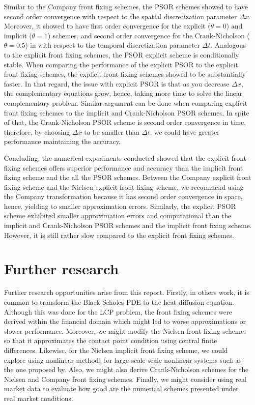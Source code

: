 Similar to the Company front fixing schemes, the PSOR schemes showed to have second order convergence with respect to the spatial discretization parameter $\Delta{x}$. Moreover, it showed to have first order convergence for the explicit ($\theta=0$) and implicit ($\theta=1$) schemes, and second order convergence for the Crank-Nicholson ($\theta=0.5$) in with respect to the temporal discretization parameter $\Delta{t}$. Analogous to the explicit front fixing schemes, the PSOR explicit scheme is conditionally stable. When comparing the performance of the explicit PSOR to the explicit front fixing schemes, the explicit front fixing schemes showed to be substantially faster. In that regard, the issue with explicit PSOR is that as you decrease $\Delta{x}$, the complementary equations grow, hence, taking more time to solve the linear complementary problem. Similar argument can be done when comparing explicit front fixing schemes to the implicit and Crank-Nicholson PSOR schemes. In spite of that, the Crank-Nicholson PSOR scheme is second order convergence in time, therefore, by choosing $\Delta{x}$ to be smaller than $\Delta{t}$, we could have greater performance maintaining the accuracy. 

Concluding, the numerical experiments conducted showed that the explicit front-fixing schemes offers superior performance and accuracy than the implicit front fixing scheme and the all the PSOR schemes. Between the Company explicit front fixing scheme and the Nielsen explicit front fixing scheme, we recommend using the Company transformation because it has second order convergence in space, hence, yielding to smaller approximation errors. Similarly, the explicit PSOR scheme exhibited smaller approximation errors and computational than the implicit and Crank-Nicholson PSOR schemes and the implicit front fixing scheme. However, it is still rather slow compared to the explicit front fixing schemes.

\section{Further research}

Further research opportunities arise from this report. Firstly, in others work\cite{dewynne_howison_wilmott_howison_1995}\cite{seydel_2009}\cite{wu1997front}, it is common to transform the Black-Scholes PDE to the heat diffusion equation. Although this was done for the LCP problem, the front fixing schemes were derived within the financial domain which might led to worse approximations or slower performance. Moreover, we might modify the Nielsen front fixing schemes so that it approximates the contact point condition using central finite differences. Likewise, for the Nielsen implicit front fixing scheme, we could explore using nonlinear methods for large scale-scale nonlinear systems such as the one proposed by\cite{lacruz_2006}. Also, we might also derive Crank-Nicholson schemes for the Nielsen and Company front fixing schemes. Finally, we might consider using real market data to evaluate how good are the numerical schemes presented under real market conditions.
